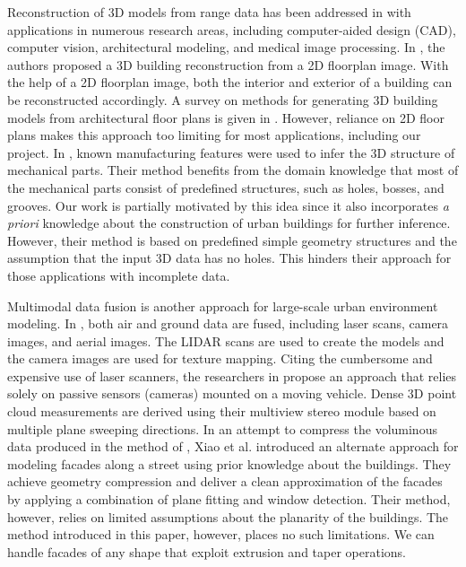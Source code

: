 \documentclass[review]{acmsiggraph}       %
\begin{document}
Reconstruction of 3D models from range data has been addressed in
\cite{RE_Fisher,RE_CLF,RE_CD} with applications in numerous research areas,
including computer-aided design (CAD), computer vision, architectural modeling,
and medical image processing.
In \cite{DP_OWYC}, the authors proposed a 3D building reconstruction from a
2D floorplan image.
With the help of a 2D floorplan image, both the interior and exterior of a
building can be reconstructed accordingly.
A survey on methods for generating 3D building models from architectural
floor plans is given in \cite{YIN09}.
However, reliance on 2D floor plans makes this approach too limiting for
most applications, including our project.
In \cite{RE_TOGSH}, known manufacturing features were used to infer the
3D structure of mechanical parts.
Their method benefits from the domain knowledge that most of the mechanical
parts consist of predefined structures, such as holes, bosses, and grooves.
Our work is partially motivated by this idea since it also incorporates
{\it a priori} knowledge about the construction of urban buildings for further
inference.
However, their method is based on predefined simple geometry structures and
the assumption that the input 3D data has no holes.
This hinders their approach for those applications with incomplete data.

Multimodal data fusion is another approach for large-scale urban
environment modeling.
In \cite{UM_Zakhor,UM_HYN}, both air and ground data are fused, including
laser scans, camera images, and aerial images.
The LIDAR scans are used to create the models and the camera images are used
for texture mapping.
Citing the cumbersome and expensive use of laser scanners, the researchers
in \cite{AKBARZADEH06} propose an approach that relies solely on passive
sensors (cameras) mounted on a moving vehicle.
Dense 3D point cloud measurements are derived using their multiview stereo
module based on multiple plane sweeping directions.
In an attempt to compress the voluminous data produced in the method of
\cite{AKBARZADEH06}, Xiao et al. \cite{UM_XFTQ} introduced an alternate
approach for modeling facades along a street using prior knowledge about
the buildings.
They achieve geometry compression and deliver a clean approximation of the
facades by applying a combination of plane fitting and window detection.
Their method, however, relies on limited assumptions about the planarity of
the buildings.
The method introduced in this paper, however, places no such limitations.
We can handle facades of any shape that exploit extrusion and taper operations.
\end{document}
